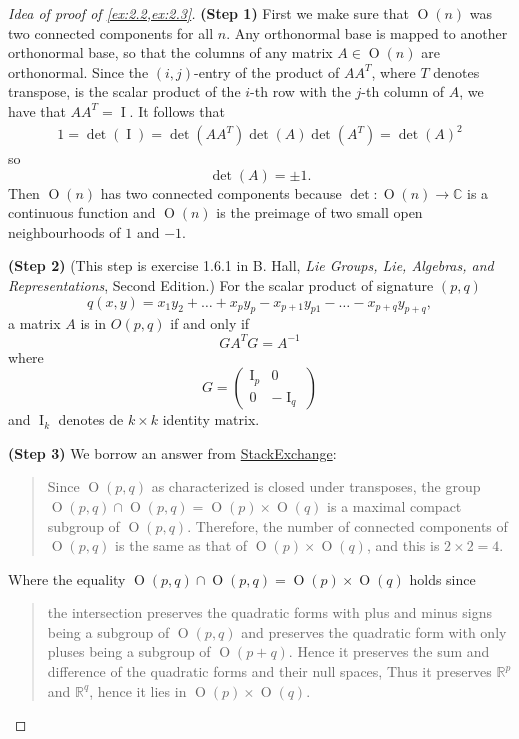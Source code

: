 \documentclass{article}
\numberwithin{equation}{section}
\newcommand{\R}{\mathbb{R}}
\newcommand{\C}{\mathbb{C}}
\renewcommand{\O}{\operatorname{O}}
\DeclareMathOperator{\I}{I}
\begin{document}
	\begin{proof}[Idea of proof of \cref{ex:2.2,ex:2.3}]\leavevmode
		
		\textbf{(Step 1)} First we make sure that $\O(n)$ was two connected components for all $n$. Any orthonormal base is mapped to another orthonormal base, so that the columns of any matrix $A\in\O(n)$ are orthonormal. Since the $(i,j)$-entry of the product of $AA^T$, where $T$ denotes transpose, is the scalar product of the $i$-th row with the $j$-th column of $A$, we have that $AA^T=\I$. It follows that
		\begin{align*}
			1=\det(\I)=\det(AA^T)\det(A)\det(A^T)=\det(A)^2
		\end{align*}
		so
		\[\det(A)=\pm1.\]
		Then $\O(n)$ has two connected components because $\det:\O(n)\to\C$ is a continuous function and $\O(n)$ is the preimage of two small open neighbourhoods of $1$ and $-1$.
		
		\textbf{(Step 2)} \iffalse Next we claim that if $q(x,y)=x_1y_1-x_2y_2$, a matrix $A$ is in $O(1,1)$ if and only if \[GA^TG=A^{-1}\] where
		\[G=\begin{pmatrix}
			1&0\\
			0&-1
		\end{pmatrix}.\]\fi
		(This step is exercise 1.6.1 in B. Hall, \textit{Lie Groups, Lie, Algebras, and Representations}, Second Edition.)
		For the scalar product of signature $(p,q)$ \[q(x,y)=x_1y_2+\ldots+x_py_p-x_{p+1}y_{p
			1}-\ldots-x_{p+q}y_{p+q},\]
		a matrix $A$ is in $O(p,q)$ if and only if \[GA^TG=A^{-1}\] where
		\[G=\begin{pmatrix}
			\I_p&0\\
			0&-\I_q
		\end{pmatrix}\]
		and $\I_k$ denotes de $k\times k$ identity matrix.
		
		\textbf{(Step 3)} We borrow an answer from \href{https://mathoverflow.net/questions/297985/why-is-onk-not-connected-and-has-four-connected-components?_gl=1*e8aadb*_ga*MjE5NTQwOTAxLjE3MTE3MzY5Njk.*_ga_S812YQPLT2*MTcxMTczNjk2OS4xLjAuMTcxMTczNjk2OS4wLjAuMA..}{StackExchange}:
		\begin{quote}
			Since $\O(p,q)$ as characterized is closed under transposes, the group $\O(p,q)\cap\O(p,q)=\O(p)\times\O(q)$ is a maximal compact subgroup of $\O(p,q)$. Therefore, the number of connected components of $\O(p,q)$ is the same as that of $\O(p)\times\O(q)$, and this is $2\times 2=4$.
		\end{quote}
		Where the equality $\O(p,q)\cap\O(p,q)=\O(p)\times\O(q)$ holds since
		\begin{quote}
			the intersection preserves the quadratic forms with plus and minus signs being a subgroup of $\O(p,q)$ and preserves the quadratic form with only pluses being a subgroup of $\O(p+q)$. Hence it preserves the sum and difference of the quadratic forms and their null spaces, Thus it preserves $\R^p$ and $\R^q$, hence it lies in $\O(p)\times\O(q)$.
		\end{quote}
		

\end{proof}
\end{document}
